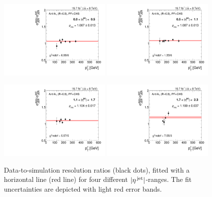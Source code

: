 \begin{figure}[t]
 \centering
    \includegraphics[width=0.49\textwidth]{figures/resolution/results/Ratio_Resolution_for_1_eta_bin_PFCHS_data_comparison_RMS99.pdf}
    \includegraphics[width=0.49\textwidth]{figures/resolution/results/Ratio_Resolution_for_2_eta_bin_PFCHS_data_comparison_RMS99.pdf}
    \vspace{18pt}

    \includegraphics[width=0.49\textwidth]{figures/resolution/results/Ratio_Resolution_for_3_eta_bin_PFCHS_data_comparison_RMS99.pdf}
    \includegraphics[width=0.49\textwidth]{figures/resolution/results/Ratio_Resolution_for_4_eta_bin_PFCHS_data_comparison_RMS99.pdf}
  \caption{Data-to-simulation resolution ratios (black dots), fitted with a horizontal line (red line) for four different $|{\eta}^{\text{\,jet}}|$-ranges.
           The fit uncertainties are depicted with light red error bands.}
  \label{res:fig:RatioEtaBinned}
\end{figure}

